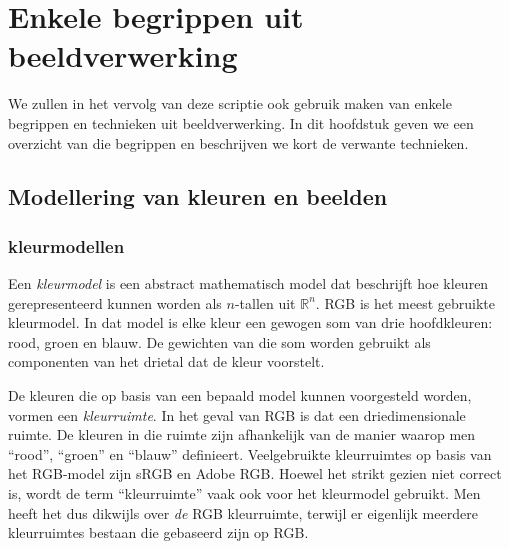 \chapter{Enkele begrippen uit beeldverwerking}

We zullen in het vervolg van deze scriptie ook gebruik maken van enkele
begrippen en technieken uit beeldverwerking. In dit hoofdstuk geven we 
een overzicht van die begrippen en beschrijven we kort de verwante
technieken.

\section{Modellering van kleuren en beelden}

\subsection{kleurmodellen}

Een \emph{kleurmodel} is een abstract mathematisch model dat beschrijft hoe kleuren gerepresenteerd 
kunnen worden als $n$-tallen uit $\mathbb{R}^n$. RGB is het meest gebruikte kleurmodel. In dat model is elke kleur
een gewogen som van drie hoofdkleuren: rood, groen en blauw. De gewichten van die som
worden gebruikt als componenten van het drietal dat de kleur voorstelt. 

De kleuren die op basis van een bepaald model kunnen voorgesteld worden, vormen een \emph{kleurruimte}. 
In het geval van RGB is dat een driedimensionale ruimte. De kleuren in die ruimte zijn afhankelijk
van de manier waarop men ``rood'', ``groen'' en ``blauw'' definieert. Veelgebruikte kleurruimtes 
op basis van het RGB-model zijn sRGB en Adobe RGB.
Hoewel het strikt gezien niet correct is, wordt de term ``kleurruimte'' vaak ook voor het
kleurmodel gebruikt. Men heeft het dus dikwijls over \emph{de} RGB kleurruimte, terwijl er eigenlijk meerdere
kleurruimtes bestaan die gebaseerd zijn op RGB. 

